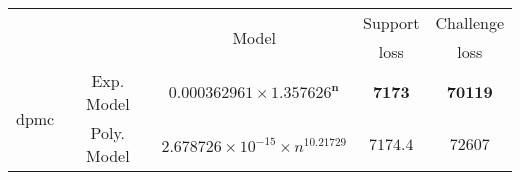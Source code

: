 \begin{tabular}{ccccc} 
\hline 
 &  & \multirow{2}{*}{Model} & Support & Challenge\tabularnewline 
 &  &  & loss  & loss\tabularnewline 
\hline 
\hline 
\multirow{2}{*}{dpmc} & Exp. Model & $\mathbf{0.000362961\times 1.357626^{n}}$ & $\mathbf{7173}$ & $\mathbf{70119}$ \tabularnewline 
 & Poly. Model & $2.678726\times10^{-15}\times n^{10.21729}$ & $7174.4$ & $72607$ \tabularnewline 
\hline 
\end{tabular} 

